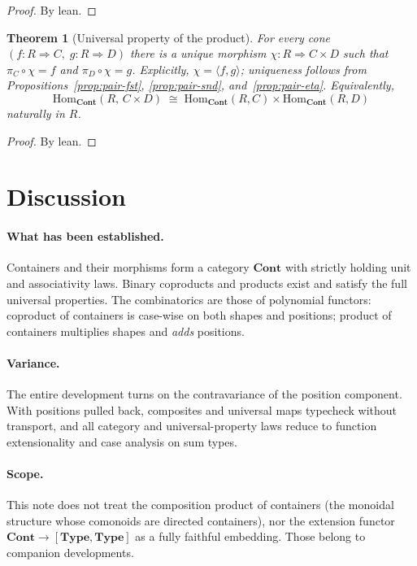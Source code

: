 \documentclass[11pt,a4paper]{article}
\theoremstyle{plain}
\newtheorem{theorem}{Theorem}[section]
\theoremstyle{definition}
\newcommand{\Type}{\mathbf{Type}}
\newcommand{\Cont}{\mathbf{Cont}}
\newcommand{\Hom}{\mathrm{Hom}}
\begin{document}
\begin{proof}
By lean.
\end{proof}

\begin{theorem}[Universal property of the product]\label{thm:prod-up}
For every cone $(f:R\Rightarrow C,\;g:R\Rightarrow D)$ there is a unique
morphism $\chi:R\Rightarrow C\times D$ such that $\pi_C\circ\chi=f$ and
$\pi_D\circ\chi=g$. Explicitly, $\chi=\langle f,g\rangle$; uniqueness follows
from Propositions~\ref{prop:pair-fst}, \ref{prop:pair-snd},
and~\ref{prop:pair-eta}. Equivalently,
\begin{equation}
  \Hom_{\Cont}(R,\,C\times D)
  \;\cong\;
  \Hom_{\Cont}(R,C)\times\Hom_{\Cont}(R,D)
\end{equation}
naturally in $R$.
\end{theorem}

\begin{proof}
By lean.
\end{proof}

\section{Discussion}

\paragraph{What has been established.}
Containers and their morphisms form a category $\Cont$ with strictly holding
unit and associativity laws. Binary coproducts and products exist and satisfy
the full universal properties. The combinatorics are those of polynomial
functors: coproduct of containers is case-wise on both shapes and positions;
product of containers multiplies shapes and \emph{adds} positions.

\paragraph{Variance.}
The entire development turns on the contravariance of the position component.
With positions pulled back, composites and universal maps typecheck without
transport, and all category and universal-property laws reduce to function
extensionality and case analysis on sum types.

\paragraph{Scope.}
This note does not treat the composition product of containers (the monoidal
structure whose comonoids are directed containers), nor the extension functor
$\Cont\to[\Type,\Type]$ as a fully faithful embedding. Those belong to
companion developments.
\end{document}
